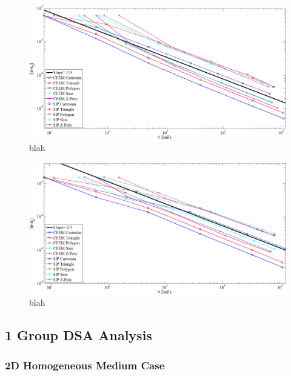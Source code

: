 \begin{figure}
\centering
\includegraphics[width=\textwidth]{figures/sec_DSA/SIP_mms_3d_quad_full_paint.png}
\caption{blah}
\label{fig::SIP_mms_quad_error_plot}
\end{figure}

\begin{figure}
\centering
\includegraphics[width=\textwidth]{figures/sec_DSA/SIP_mms_3d_gauss_full_paint.png}
\caption{blah}
\label{fig::SIP_mms_gauss_error_plot}
\end{figure}


\subsection{1 Group DSA Analysis}
\label{sec::DSA_Results_1G}

\subsubsection{2D Homogeneous Medium Case}
\label{sec::DSA_Results_1G_2DHomo}

